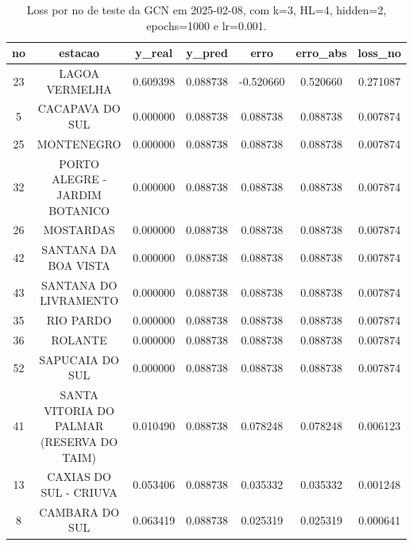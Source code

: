\begin{table}[h]
\centering
\caption{Loss por no de teste da GCN em 2025-02-08, com k=3, HL=4, hidden=2, epochs=1000 e lr=0.001.}
\label{tab:gcn_loss_k3_hl4_h2_e1000_d20250208}
\begin{tabular}{ccccccc}
\toprule
no & estacao & y\_real & y\_pred & erro & erro\_abs & loss\_no \\
\midrule
23 & LAGOA VERMELHA & 0.609398 & 0.088738 & -0.520660 & 0.520660 & 0.271087 \\
5 & CACAPAVA DO SUL & 0.000000 & 0.088738 & 0.088738 & 0.088738 & 0.007874 \\
25 & MONTENEGRO & 0.000000 & 0.088738 & 0.088738 & 0.088738 & 0.007874 \\
32 & PORTO ALEGRE - JARDIM BOTANICO & 0.000000 & 0.088738 & 0.088738 & 0.088738 & 0.007874 \\
26 & MOSTARDAS & 0.000000 & 0.088738 & 0.088738 & 0.088738 & 0.007874 \\
42 & SANTANA DA BOA VISTA & 0.000000 & 0.088738 & 0.088738 & 0.088738 & 0.007874 \\
43 & SANTANA DO LIVRAMENTO & 0.000000 & 0.088738 & 0.088738 & 0.088738 & 0.007874 \\
35 & RIO PARDO & 0.000000 & 0.088738 & 0.088738 & 0.088738 & 0.007874 \\
36 & ROLANTE & 0.000000 & 0.088738 & 0.088738 & 0.088738 & 0.007874 \\
52 & SAPUCAIA DO SUL & 0.000000 & 0.088738 & 0.088738 & 0.088738 & 0.007874 \\
41 & SANTA VITORIA DO PALMAR (RESERVA DO TAIM) & 0.010490 & 0.088738 & 0.078248 & 0.078248 & 0.006123 \\
13 & CAXIAS DO SUL - CRIUVA & 0.053406 & 0.088738 & 0.035332 & 0.035332 & 0.001248 \\
8 & CAMBARA DO SUL & 0.063419 & 0.088738 & 0.025319 & 0.025319 & 0.000641 \\
\bottomrule
\end{tabular}
\end{table}
